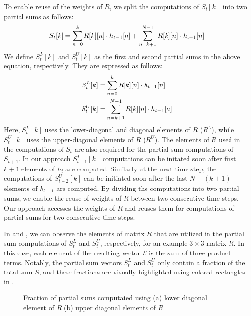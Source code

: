 To enable reuse of the weights of $R$, we split the computations of $S_{t}[k]$ into two partial sums as follows:
\begin{align}\label{eq:S_{t}_split}
	S_{t}[k] = \sum_{n=0}^{k}R[k][n]\cdot h_{t-1}[n] + \sum_{n=k+1}^{N-1}R[k][n]\cdot h_{t-1}[n]
\end{align}
We define $S_{t}^{L}[k]$ and $S_{t}^{U}[k]$ as the first and second partial sums in the above equation, respectively. They are expressed as follows: 
\begin{align}
	S_{t}^{L}[k] &= \sum_{n=0}^{k}R[k][n]\cdot h_{t-1}[n] \label{eq:S_L_{t}}\\
	S_{t}^{U}[k] &= \sum_{n=k{+}1}^{N-1}R[k][n]\cdot h_{t-1}[n] \label{eq:S_U_{t}}
\end{align}
Here, $S_{t}^{L}[k]$ uses the lower-diagonal and diagonal elements of $R$ ($R^L$), while $S_{t}^{U}[k]$ uses the upper-diagonal elements of $R$ ($R^U$). The elements of $R$ used in the computations of $S_{t}$ are also required for the partial sum computations of $S_{t+1}$.
In our approach $S_{t{+}1}^{L}[k]$ computations can be initated soon after first $k{+}1$ elements of $h_{t}$ are computed. Similarly at the next time step, the computations of $S^U_{t{+}2}[k]$ can be initiated soon after the last $N{-}(k{+}1)$ elements of $h_{t{+}1}$ are computed. By dividing the computations into two partial sums, we enable the reuse of weights of $R$ between two consecutive time steps. Our approach accesses the weights of $R$ and reuses them for computations of partial sums for two consecutive time steps.

In  and , we can observe the elements of matrix $R$ that are utilized in the partial sum computations of $S_{t}^{L}$ and $S_{t}^{U}$, respectively, for an example $3\times3$ matrix $R$. In this case, each element of the resulting vector $S$ is the sum of three product terms. Notably, the partial sum vectors $S^L_t$ and $S^U_t$ only contain a fraction of the total sum $S$, and these fractions are visually highlighted using colored rectangles in .

\begin{figure}[htb!]
	\centering
	\hspace{2.0em}
	\caption{Fraction of partial sums computated using (a) lower diagonal element of $R$  (b) upper diagonal elements of $R$ }
	\label{fig:partialSumComputations}
\end{figure}

